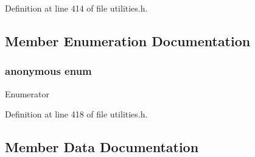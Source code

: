 Definition at line 414 of file utilities.\+h.



\subsection{Member Enumeration Documentation}
\hypertarget{structcrap_1_1limits_3_01int64__t_01_4_a575b4571877a8b378a73249189d9e634}{}\subsubsection[{anonymous enum}]{\setlength{\rightskip}{0pt plus 5cm}anonymous enum}\label{structcrap_1_1limits_3_01int64__t_01_4_a575b4571877a8b378a73249189d9e634}
\begin{Desc}
\item[Enumerator]\par
\begin{description}
\item[{\em 
\hypertarget{structcrap_1_1limits_3_01int64__t_01_4_a575b4571877a8b378a73249189d9e634acf53b7e1c565b02ca4fcc9ff703a4a97}{}I\+S\+\_\+\+I\+N\+T\label{structcrap_1_1limits_3_01int64__t_01_4_a575b4571877a8b378a73249189d9e634acf53b7e1c565b02ca4fcc9ff703a4a97}
}]\item[{\em 
\hypertarget{structcrap_1_1limits_3_01int64__t_01_4_a575b4571877a8b378a73249189d9e634a2db27bf399f2fcc1977572ab2bfb9d66}{}I\+S\+\_\+\+S\+I\+G\+N\+E\+D\label{structcrap_1_1limits_3_01int64__t_01_4_a575b4571877a8b378a73249189d9e634a2db27bf399f2fcc1977572ab2bfb9d66}
}]\end{description}
\end{Desc}


Definition at line 418 of file utilities.\+h.



\subsection{Member Data Documentation}
\hypertarget{structcrap_1_1limits_3_01int64__t_01_4_a0465e299affe12a893a3d5faa6ecf0df}{}
